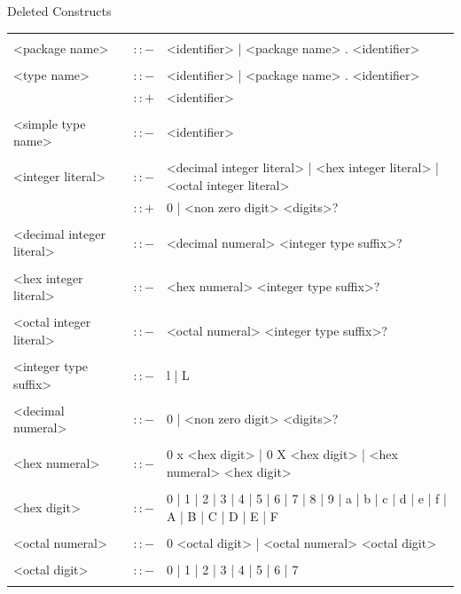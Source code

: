 \documentclass[landscape, 11pt]{article}
\begin{document}
\begin{qsection}{Deleted Constructs}
\begin{enumerate}[label=\bt{\theenumi.}]
			\begin{longtable}{R{7cm} c L{15cm}}
													&					&	 \\
				<package name>								&	$\colon\colon-$	&	<identifier> | <package name> . <identifier> \\\\
				<type name>									&	$\colon\colon-$	&	<identifier> | <package name> . <identifier> \\
															&	$\colon\colon+$	&	<identifier> \\\\
				<simple type name>							&	$\colon\colon-$	&	<identifier> \\\\
				<integer literal>							&	$\colon\colon-$	&	<decimal integer literal> | <hex integer literal> | <octal integer literal> \\
															&	$\colon\colon+$	&	0 | <non zero digit> <digits>? \\\\
				<decimal integer literal>					&	$\colon\colon-$	&	<decimal numeral> <integer type suffix>? \\\\
				<hex integer literal>						&	$\colon\colon-$	&	<hex numeral> <integer type suffix>? \\\\
				<octal integer literal>						&	$\colon\colon-$	&	<octal numeral> <integer type suffix>? \\\\
				<integer type suffix>						&	$\colon\colon-$	&	l | L \\\\
				<decimal numeral>							&	$\colon\colon-$	&	0 | <non zero digit> <digits>? \\\\
				<hex numeral>								&	$\colon\colon-$	&	0 x <hex digit> | 0 X <hex digit> | <hex numeral> <hex digit> \\\\
				<hex digit>									&	$\colon\colon-$	&	0 | 1 | 2 | 3 | 4 | 5 | 6 | 7 | 8 | 9 | a | b | c | d | e | f | A | B | C | D | E | F \\\\
				<octal numeral>								&	$\colon\colon-$	&	0 <octal digit> | <octal numeral> <octal digit> \\\\
				<octal digit>								&	$\colon\colon-$	&	0 | 1 | 2 | 3 | 4 | 5 | 6 | 7 \\\\

\end{longtable}
\end{enumerate}
\end{qsection}
\end{document}
